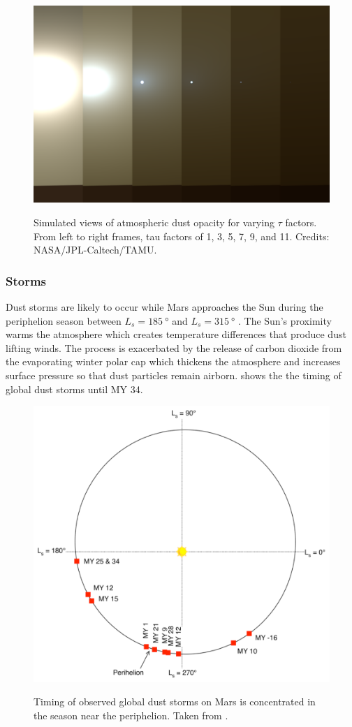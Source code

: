 \begin{figure}[h]
  \centering
  \hypersetup{linkcolor=captionTextColor}
  \includegraphics[width=0.7\linewidth]{sections/mars-solar-energy/solar-radiation/images/tau-factors.png}\\
  \caption[Simulated views of atmospheric dust opacity for varying $\tau$ factors]
          {Simulated views of atmospheric dust opacity for varying $\tau$ factors. From left to right frames, tau factors of 1, 3, 5, 7, 9, and 11. Credits: NASA/JPL-Caltech/TAMU.}
  \label{fig:image:tau-factors}
\end{figure}

\subsubsection{Storms}
\label{sec:MartianEnvironment:Dust:Storms}

Dust storms are likely to occur while Mars approaches the Sun during the periphelion season between $L_{s} = \SI{185}{\degree}$ and $L_{s} = \SI{315}{\degree}$ . The Sun's proximity warms the atmosphere which creates temperature differences that produce dust lifting winds. The process is exacerbated by the release of carbon dioxide from the evaporating winter polar cap which thickens the atmosphere and increases surface pressure so that dust particles remain airborn.  shows the the timing of global dust storms until \ac{MY} 34.

\begin{figure}[h]
  \centering
  \hypersetup{linkcolor=captionTextColor}
  \includegraphics[width=0.35\linewidth]{sections/mars-solar-energy/solar-radiation/images/timin-of-observed-global-dust-storms.png}\\
  \caption[Timing of observed global dust storms on Mars]
          {Timing of observed global dust storms on Mars is concentrated in the season near the periphelion. Taken from .}
  \label{fig:image:global-dust-storm-timing}
\end{figure}

